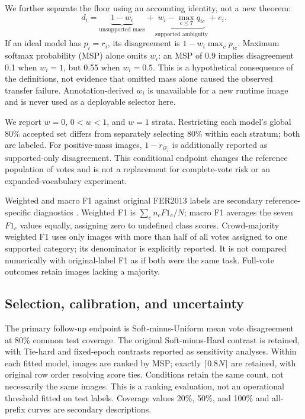 \documentclass[pdflatex,sn-mathphys-num]{sn-jnl}
\begin{document}
We further separate the floor using an accounting identity, not a new theorem:
\begin{equation}
d_i=\underbrace{1-w_i}_{\text{unsupported mass}}+
\underbrace{w_i-\max_{c\leq7}q_{ic}}_{\text{supported ambiguity}}+e_i.
\label{eq:threeparts}
\end{equation}
If an ideal model has $p_i=r_i$, its disagreement is $1-w_i\max_c p_{ic}$. Maximum softmax probability (MSP) alone omits $w_i$: an MSP of 0.9 implies disagreement 0.1 when $w_i=1$, but 0.55 when $w_i=0.5$. This is a hypothetical consequence of the definitions, not evidence that omitted mass alone caused the observed transfer failure. Annotation-derived $w_i$ is unavailable for a new runtime image and is never used as a deployable selector here.

We report $w=0$, $0<w<1$, and $w=1$ strata. Restricting each model's global 80\% accepted set differs from separately selecting 80\% within each stratum; both are labeled. For positive-mass images, $1-r_{i\hat c_i}$ is additionally reported as supported-only disagreement. This conditional endpoint changes the reference population of votes and is not a replacement for complete-vote risk or an expanded-vocabulary experiment.

Weighted and macro F1 against original FER2013 labels are secondary reference-specific diagnostics \cite{sokolova2009metrics}. Weighted F1 is $\sum_c n_c F1_c/N$; macro F1 averages the seven $F1_c$ values equally, assigning zero to undefined class scores. Crowd-majority weighted F1 uses only images with more than half of all votes assigned to one supported category; its denominator is explicitly reported. It is not compared numerically with original-label F1 as if both were the same task. Full-vote outcomes retain images lacking a majority.

\subsection{Selection, calibration, and uncertainty}
The primary follow-up endpoint is Soft-minus-Uniform mean vote disagreement at 80\% common test coverage. The original Soft-minus-Hard contrast is retained, with Tie-hard and fixed-epoch contrasts reported as sensitivity analyses. Within each fitted model, images are ranked by MSP; exactly $\lceil0.8N\rceil$ are retained, with original row order resolving score ties. Conditions retain the same count, not necessarily the same images. This is a ranking evaluation, not an operational threshold fitted on test labels. Coverage values 20\%, 50\%, and 100\% and all-prefix curves are secondary descriptions.
\end{document}
